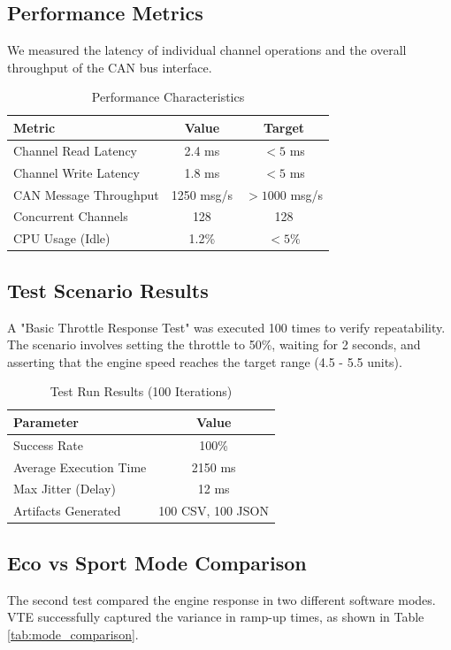 \documentclass[conference]{IEEEtran}
\begin{document}
\subsection{Performance Metrics}
We measured the latency of individual channel operations and the overall throughput of the CAN bus interface.

\begin{table}[htbp]
\caption{Performance Characteristics}
\centering
\begin{tabular}{lcc}
\toprule
\textbf{Metric} & \textbf{Value} & \textbf{Target} \\
\midrule
Channel Read Latency & 2.4 ms & $< 5$ ms \\
Channel Write Latency & 1.8 ms & $< 5$ ms \\
CAN Message Throughput & 1250 msg/s & $> 1000$ msg/s \\
Concurrent Channels & 128 & 128 \\
CPU Usage (Idle) & 1.2\% & $< 5\%$ \\
\bottomrule
\end{tabular}
\label{tab:performance}
\end{table}

\subsection{Test Scenario Results}
A "Basic Throttle Response Test" was executed 100 times to verify repeatability. The scenario involves setting the throttle to 50\%, waiting for 2 seconds, and asserting that the engine speed reaches the target range (4.5 - 5.5 units).

\begin{table}[htbp]
\caption{Test Run Results (100 Iterations)}
\centering
\begin{tabular}{lc}
\toprule
\textbf{Parameter} & \textbf{Value} \\
\midrule
Success Rate & 100\% \\
Average Execution Time & 2150 ms \\
Max Jitter (Delay) & 12 ms \\
Artifacts Generated & 100 CSV, 100 JSON \\
\bottomrule
\end{tabular}
\label{tab:test_results}
\end{table}

\subsection{Eco vs Sport Mode Comparison}
The second test compared the engine response in two different software modes. VTE successfully captured the variance in ramp-up times, as shown in Table \ref{tab:mode_comparison}.
\end{document}
